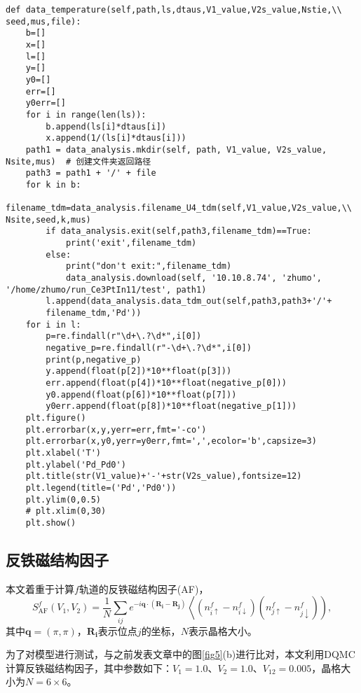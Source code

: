 \begin{lstlisting}
def data_temperature(self,path,ls,dtaus,V1_value,V2s_value,Nstie,\\ seed,mus,file):
    b=[]
    x=[]
    l=[]
    y=[]
    y0=[]
    err=[]
    y0err=[]
    for i in range(len(ls)):
        b.append(ls[i]*dtaus[i])
        x.append(1/(ls[i]*dtaus[i]))
    path1 = data_analysis.mkdir(self, path, V1_value, V2s_value, Nsite,mus)  # 创建文件夹返回路径
    path3 = path1 + '/' + file
    for k in b:
        filename_tdm=data_analysis.filename_U4_tdm(self,V1_value,V2s_value,\\ Nsite,seed,k,mus)
        if data_analysis.exit(self,path3,filename_tdm)==True:
            print('exit',filename_tdm)
        else:
            print("don't exit:",filename_tdm)
            data_analysis.download(self, '10.10.8.74', 'zhumo', '/home/zhumo/run_Ce3PtIn11/test', path1)
        l.append(data_analysis.data_tdm_out(self,path3,path3+'/'+
        filename_tdm,'Pd'))
    for i in l:
        p=re.findall(r"\d+\.?\d*",i[0])
        negative_p=re.findall(r"-\d+\.?\d*",i[0])
        print(p,negative_p)
        y.append(float(p[2])*10**float(p[3]))
        err.append(float(p[4])*10**float(negative_p[0]))
        y0.append(float(p[6])*10**float(p[7]))
        y0err.append(float(p[8])*10**float(negative_p[1]))
    plt.figure()
    plt.errorbar(x,y,yerr=err,fmt='-co')
    plt.errorbar(x,y0,yerr=y0err,fmt=',',ecolor='b',capsize=3)
    plt.xlabel('T')
    plt.ylabel('Pd_Pd0')
    plt.title(str(V1_value)+'-'+str(V2s_value),fontsize=12)
    plt.legend(title=('Pd','Pd0'))
    plt.ylim(0,0.5)
    # plt.xlim(0,30)
    plt.show()
\end{lstlisting}



\subsection{反铁磁结构因子}%
本文着重于计算$f$轨道的反铁磁结构因子(AF)，
$$
S_{\mathrm{AF}}^{f}\left(V_{1}, V_{2}\right)=\frac{1}{N} \sum_{i j} e^{-i \mathbf{q} \cdot\left(\mathbf{R}_{\mathbf{i}}-\mathbf{R}_{\mathbf{j}}\right)}\left\langle\left(n_{i \uparrow}^{f}-n_{i \downarrow}^{f}\right)\left(n_{j \uparrow}^{f}-n_{j \downarrow}^{f}\right)\right),
$$
其中$\mathbf{q}=(\pi,\pi)$，$\mathbf{R_i}$表示位点$j$的坐标，$N$表示晶格大小。

为了对模型进行测试，与之前发表文章中的图\ref{fig5}(b)进行比对，本文利用DQMC计算反铁磁结构因子，其中参数如下：$V_1=1.0$、$V_{2}=1.0$、$V_{12}=0.005$，晶格大小为$N=6 \times 6$。


